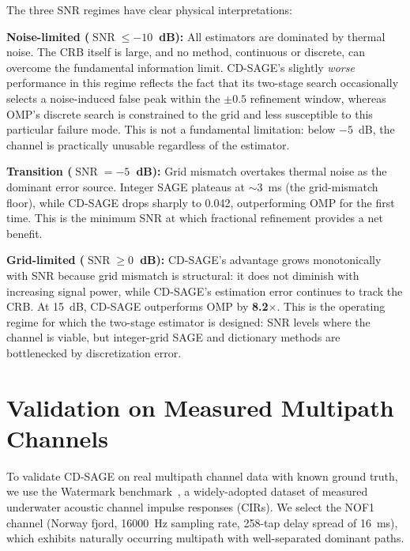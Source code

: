 \documentclass[a4paper,fleqn]{cas-dc}
\DeclareMathOperator{\SNR}{SNR}
\begin{document}
The three SNR regimes have clear physical interpretations:

\textbf{Noise-limited ($\SNR \le -10$~dB):} All estimators are dominated by thermal noise. The CRB itself is large, and no method, continuous or discrete, can overcome the fundamental information limit. CD-SAGE's slightly \textit{worse} performance in this regime reflects the fact that its two-stage search occasionally selects a noise-induced false peak within the $\pm 0.5$ refinement window, whereas OMP's discrete search is constrained to the grid and less susceptible to this particular failure mode. This is not a fundamental limitation: below $-5$~dB, the channel is practically unusable regardless of the estimator.

\textbf{Transition ($\SNR = -5$~dB):} Grid mismatch overtakes thermal noise as the dominant error source. Integer SAGE plateaus at $\sim$3~ms (the grid-mismatch floor), while CD-SAGE drops sharply to 0.042, outperforming OMP for the first time. This is the minimum SNR at which fractional refinement provides a net benefit.

\textbf{Grid-limited ($\SNR \ge 0$~dB):} CD-SAGE's advantage grows monotonically with SNR because grid mismatch is structural: it does not diminish with increasing signal power, while CD-SAGE's estimation error continues to track the CRB. At \SI{+15}{dB}, CD-SAGE outperforms OMP by \textbf{8.2$\times$}. This is the operating regime for which the two-stage estimator is designed: SNR levels where the channel is viable, but integer-grid SAGE and dictionary methods are bottlenecked by discretization error.

\section{Validation on Measured Multipath Channels}
\label{sec:watermark}

To validate CD-SAGE on real multipath channel data with known ground truth, we use the Watermark benchmark~\cite{vanwalreeWatermarkBenchmarkUnderwater2017}, a widely-adopted dataset of measured underwater acoustic channel impulse responses (CIRs). We select the NOF1 channel (Norway fjord, \SI{16000}{Hz} sampling rate, 258-tap delay spread of \SI{16}{ms}), which exhibits naturally occurring multipath with well-separated dominant paths.
\end{document}

